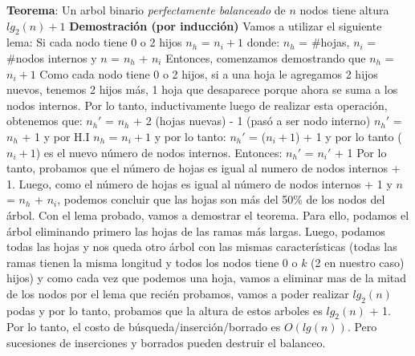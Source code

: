 \documentclass[10pt,a4paper]{article}
\begin{document}
\textbf{Teorema}: Un arbol binario \textit{perfectamente balanceado} de $n$ nodos tiene altura $lg_{2}(n) + 1$
\newline
\newline
\textbf{Demostración (por inducción)}
\newline
\newline
Vamos a utilizar el siguiente lema:
\newline
\newline
Si cada nodo tiene 0 o 2 hijos $n_{h}$ = $n_{i} + 1$ donde:
\newline
\newline
$n_{h}$ = \#hojas, $n_{i}$ = \#nodos internos y $n$ = $n_{h}$ + $n_{i}$  
\newline
\newline
Entonces, comenzamos demostrando que $n_{h}$ = $n_{i} + 1$ 
\newline
\newline
Como cada nodo tiene 0 o 2 hijos, si a una hoja le agregamos 2 hijos nuevos, tenemos 2 hijos más, 1 hoja que desaparece porque ahora se suma a los nodos internos. Por lo tanto, inductivamente luego de realizar esta operación, obtenemos que:
\newline
\newline
$n_{h}'$ = $n_{h}$ + 2 (hojas nuevas) - 1 (pasó a ser nodo interno) 
\newline
\newline
$n_{h}'$ = $n_{h}$ + 1 y por H.I $n_{h}$ = $n_{i} + 1$ y por lo tanto:
\newline
\newline
$n_{h}'$ = ($n_{i} + 1$) + 1 y por lo tanto ($n_{i} + 1$) es el nuevo número de nodos internos. Entonces:
\newline
\newline
$n_{h}'$ = $n_{i}'$ + 1
\newline
\newline
Por lo tanto, probamos que el número de hojas es igual al numero de nodos internos + 1.
\newline
\newline
Luego, como el número de hojas es igual al número de nodos internos + 1 y $n$ = $n_{h}$ + $n_{i}$, podemos concluir que las hojas son más del 50\% de los nodos del árbol.
\newline
\newline
Con el lema probado, vamos a demostrar el teorema. Para ello, podamos el árbol eliminando primero las hojas de las ramas más largas. Luego, podamos todas las hojas y nos queda otro árbol con las mismas características (todas las ramas tienen la misma longitud y todos los nodos tiene 0 o $k$ (2 en nuestro caso) hijos) y como cada vez que podemos una hoja, vamos a eliminar mas de la mitad de los nodos por el lema que recién probamos, vamos a poder realizar $lg_{2}(n)$ podas y por lo tanto, probamos que la altura de estos arboles es $lg_{2}(n)$ + 1.  
\newline
\newline
Por lo tanto, el costo de búsqueda/inserción/borrado es $O(lg(n))$.
\newline
\newline
Pero sucesiones de inserciones y borrados pueden destruir el balanceo.
\newpage
\end{document}
